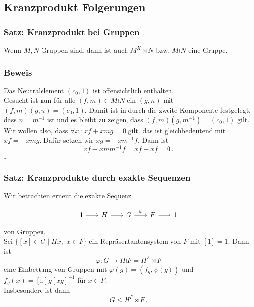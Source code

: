 \documentclass[12pt, german]{article}
\newcommand{\bewiesen}{
	
	\begin{flushright}
		$\square$  \\
\end{flushright}}
\begin{document}
	\subsection{Kranzprodukt Folgerungen}
	\subsubsection{Satz: Kranzprodukt bei Gruppen}
	Wenn $M, N$ Gruppen sind, dann ist auch $M^X \rtimes N$ bzw. $M \wr N$ eine Gruppe. 
	
	\subsubsection{Beweis}
	Das Neutralelement $(c_0, 1)$ ist offensichtlich enthalten.\\
	Gesucht ist nun für alle $(f, m) \in M \wr N$ ein $(g,n)$ mit $(f, m)(g,n) = (c_0, 1)$.
	Damit ist in durch die zweite Komponente festgelegt, dass $n=m^{-1}$ ist und es bleibt zu zeigen, dass $(f,m)(g, m^{-1}) = (c_0,1)$  gilt. \\
	Wir wollen also, dass $\forall x \, : \,xf+xmg=0$ gilt. das ist gleichbedeutend mit $xf=-xmg$.
	Dafür setzen wir $xg = -xm^{-1}f$. Dann ist $$xf-xmm^{-1}f = xf-xf = 0\, .$$	\bewiesen
	
	\subsubsection{Satz: Kranzprodukte durch exakte Sequenzen}
	Wir betrachten erneut die exakte Sequenz 
	\begin{figure}[H]
		\centering
		\begin{equation*}
			\begin{tikzcd}[column sep=1.5pc]
				1 \arrow{r}{} & H \arrow{r}{} & G \arrow{r}{\psi} & F \arrow{r}{} & 1
			\end{tikzcd}
		\end{equation*}
	\end{figure} 
	von Gruppen.\\
	Sei $\{[x] \in G \mid Hx, \, \, x \in F\}$ ein Repräsentantensystem von $F$ mit $[1] = 1$. 
	Dann ist $$\varphi: G \to H \wr F = H^F \rtimes F$$ eine Einbettung von Gruppen mit $\varphi(g) = (f_g, \psi(g))$ und $f_g(x) = [x]g[xg]^{-1}$ für $x \in F$. \\  Insbesondere ist dann $$G \leq H^F \rtimes F\, .$$
	
\end{document}

